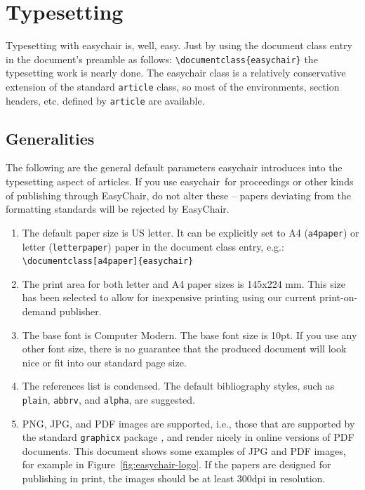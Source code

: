 \documentclass[EPiC]{easychair}
\newcommand{\easychair}{\textsf{easychair}}
\begin{document}
\section{Typesetting}
\label{sect:typesetting}

Typesetting with {\easychair} is, well, easy.  Just by using the
document class entry in the document's preamble as follows:
\verb+\documentclass{easychair}+ the typesetting work is nearly done.
The {\easychair} class is a relatively conservative extension of the
standard \texttt{article} class, so most of the environments, section
headers, etc. defined by \texttt{article} are available.

\subsection{Generalities}
\label{sect:generalities}

The following are the general default parameters {\easychair}
introduces into the typesetting aspect of articles. If you use
\easychair\ for proceedings or other kinds of publishing through
EasyChair, do not alter these -- papers deviating from the formatting
standards will be rejected by EasyChair.

\begin{enumerate}
\item
The default paper size is US letter. It can be explicitly set to A4 
(\texttt{a4paper}) or letter (\texttt{letterpaper}) paper in the
document class entry, e.g.:\\\verb+\documentclass[a4paper]{easychair}+

\item
The print area for both letter and A4 paper sizes is 145x224 mm. This size
has been selected to allow for inexpensive printing using our current
print-on-demand publisher.

\item
The base font is Computer Modern. The base font size is 10pt. If you
use any other font size, there is no guarantee that the produced
document will look nice or fit into our standard page size.

\item
The references list is condensed. The default bibliography styles, such as
\texttt{plain}, \texttt{abbrv}, and \texttt{alpha}, are suggested.

\item
PNG, JPG, and PDF images are supported, i.e., those that are supported
by the standard \texttt{graphicx} package \cite{graphicx-package}, and
render nicely in online versions of PDF documents.  This document
shows some examples of JPG and PDF images, for example in
Figure~\ref{fig:easychair-logo}. If the papers are designed for
publishing in print, the images should be at least 300dpi in
resolution. 

\end{enumerate}
\end{document}
